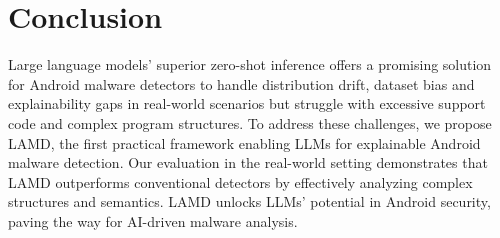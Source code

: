 \section{Conclusion}
Large language models’ superior zero-shot inference offers a promising solution for Android malware detectors to handle distribution drift, dataset bias and explainability gaps in real-world scenarios but struggle with excessive support code and complex program structures. To address these challenges, we propose LAMD, the first practical framework enabling LLMs for explainable Android malware detection. Our evaluation in the real-world setting demonstrates that LAMD outperforms conventional detectors by effectively analyzing complex structures and semantics. LAMD unlocks LLMs' potential in Android security, paving the way for AI-driven malware analysis. 




